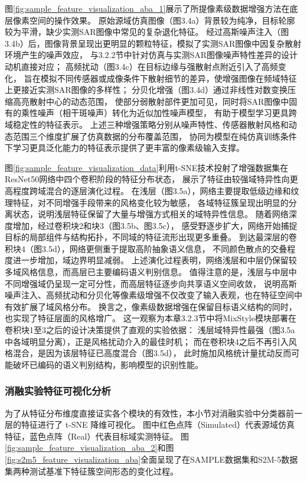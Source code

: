 图\ref{fig:sample_feature_visualization_aba_1}展示了所提像素级数据增强方法在底层像素空间的操作效果。
原始源域仿真图像（图3.4a）背景较为纯净，目标轮廓较为平滑，缺少实测SAR图像中常见的复杂退化特征。
经过高斯噪声注入（图3.4b）后，图像背景呈现出更明显的颗粒特征，模拟了实测SAR图像中因复杂散射环境产生的噪声效应，
与3.2.2节中针对仿真与实测SAR图像噪声特性差异的设计动机直接对应；
高频扰动（图3.4c）在目标边缘与强散射点附近引入了高频变化，
旨在模拟不同传感器或成像条件下散射细节的差异，使增强图像在频域特征上更接近实测SAR图像的多样性；
分贝化增强（图3.4d）通过非线性对数变换压缩高亮散射中心的动态范围，
使部分弱散射部件更加可见，同时将SAR图像中固有的乘性噪声（相干斑噪声）转化为近似加性噪声模型，
有助于模型学习更具跨域稳定性的特征表示。
上述三种增强策略分别从噪声特性、传感器散射风格和动态范围三个维度扩展了仿真数据的分布覆盖范围，
协同为模型在纯仿真训练条件下学习更具泛化能力的特征表示提供了更丰富的像素级输入支撑。

图\ref{fig:sample_feature_visualization_data}利用t-SNE技术投射了增强数据集在ResNet50网络中四个卷积阶段的特征分布状态，
展示了特征由较强域特异性向更高程度跨域混合的逐层演化过程。
在浅层（图3.5a），网络主要提取低级边缘和纹理特征，对不同增强手段带来的风格变化较为敏感，
各域特征簇呈现出明显的分离状态，说明浅层特征保留了大量与增强方式相关的域特异性信息。
随着网络深度增加，经过卷积块2和块3（图3.5b、图3.5c），
感受野逐步扩大，网络开始捕捉目标的局部组件与结构拓扑，不同域的特征流形出现更多重叠。
到达最深层的卷积块4（图3.5d），网络更侧重于提取高阶抽象语义信息，
不同颜色散点的交叠程度进一步增加，域边界明显减弱。
上述演化过程表明，网络浅层和中层仍保留较多域风格信息，而高层已主要编码语义判别信息。
值得注意的是，浅层与中层中不同增强域仍呈现一定可分性，而高层特征逐步向共享语义空间收敛，
说明高斯噪声注入、高频扰动和分贝化等像素级增强不仅改变了输入表观，也在特征空间中有效扩展了域风格分布。
换言之，像素级数据增强在保留目标语义结构的同时，也实现了特征层面的风格增广。
这一观察为本章3.2.3节中将MixStyle模块部署在卷积块1至3之后的设计决策提供了直观的实验依据：
浅层域特异性最强（图3.5a中各域明显分离），正是风格扰动介入的最佳时机；
而在卷积块4之后不再引入风格混合，是因为该层特征已高度混合（图3.5d），
此时施加风格统计量扰动反而可能破坏已编码的语义判别结构，影响模型的识别性能。

\subsubsection{消融实验特征可视化分析}
为了从特征分布维度直接证实各个模块的有效性，本小节对消融实验中分类器前一层的特征进行了 t-SNE 降维可视化。
图中红色点阵（Simulated）代表源域仿真特征，蓝色点阵（Real）代表目标域实测特征。
图\ref{fig:sample_feature_visualization_aba_2}和图\ref{fig:s2m5_feature_visualization_aba}全面呈现了在SAMPLE数据集和S2M-5数据集两种测试基准下特征簇空间形态的变化过程。

